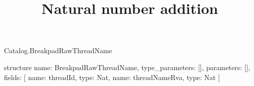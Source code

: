 \begin{lexlean}{Catalog.BreakpadRawThreadName}
\title{Natural number addition}
\begin{semanticmodule}
structure{
  name: BreakpadRawThreadName,
  type_parameters: [],
  parameters: [],
  fields: [
    {name: threadId, type: Nat},
    {name: threadNameRva, type: Nat}
  ]
}
\end{semanticmodule}
\end{lexlean}
